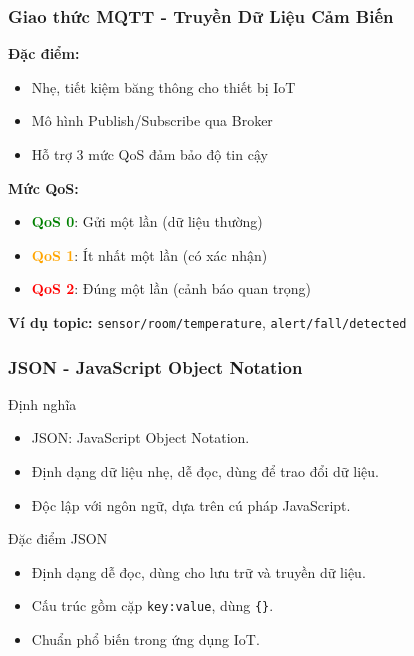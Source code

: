 \begin{frame}
\frametitle{Giao thức MQTT - Truyền Dữ Liệu Cảm Biến}

\textbf{Đặc điểm:}
\begin{itemize}
\item Nhẹ, tiết kiệm băng thông cho thiết bị IoT
\item Mô hình Publish/Subscribe qua Broker
\item Hỗ trợ 3 mức QoS đảm bảo độ tin cậy
\end{itemize}

\textbf{Mức QoS:}
\begin{itemize}
\item \textcolor{green}{\textbf{QoS 0}}: Gửi một lần (dữ liệu thường)
\item \textcolor{orange}{\textbf{QoS 1}}: Ít nhất một lần (có xác nhận)
\item \textcolor{red}{\textbf{QoS 2}}: Đúng một lần (cảnh báo quan trọng)
\end{itemize}

\textbf{Ví dụ topic:} \texttt{sensor/room/temperature}, \texttt{alert/fall/detected}
\end{frame}


\begin{frame}
\frametitle{JSON - JavaScript Object Notation}
\begin{block}{Định nghĩa}
\begin{itemize}
\item JSON: JavaScript Object Notation.
\item Định dạng dữ liệu nhẹ, dễ đọc, dùng để trao đổi dữ liệu.
\item Độc lập với ngôn ngữ, dựa trên cú pháp JavaScript.
\end{itemize}
\end{block}

\begin{block}{Đặc điểm JSON}
\begin{itemize}
\item Định dạng dễ đọc, dùng cho lưu trữ và truyền dữ liệu.
\item Cấu trúc gồm cặp \texttt{key:value}, dùng \texttt{\{\}}.
\item Chuẩn phổ biến trong ứng dụng IoT.
\end{itemize}
\end{block}
\end{frame}

